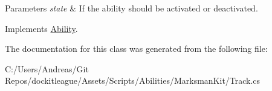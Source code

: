 \begin{DoxyParams}{Parameters}
{\em state} & If the ability should be activated or deactivated.\\
\hline
\end{DoxyParams}


Implements \hyperlink{class_ability_a10f7f3c2b63eeef6e352aee48d246384}{Ability}.



The documentation for this class was generated from the following file\+:\begin{DoxyCompactItemize}
\item 
C\+:/\+Users/\+Andreas/\+Git Repos/dockitleague/\+Assets/\+Scripts/\+Abilities/\+Marksman\+Kit/Track.\+cs\end{DoxyCompactItemize}
